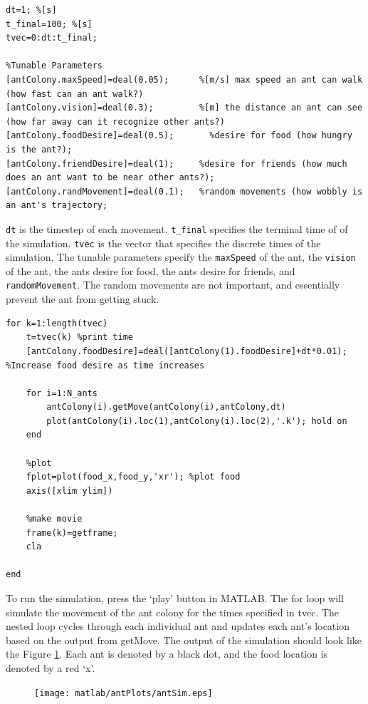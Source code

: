 \documentclass[12pt]{article}
\begin{document}
\begin{lstlisting}[frame=single]
%% Run movement simulation
dt=1; %[s]
t_final=100; %[s]
tvec=0:dt:t_final;

%Tunable Parameters
[antColony.maxSpeed]=deal(0.05);      %[m/s] max speed an ant can walk (how fast can an ant walk?)
[antColony.vision]=deal(0.3);         %[m] the distance an ant can see (how far away can it recognize other ants?)
[antColony.foodDesire]=deal(0.5);       %desire for food (how hungry is the ant?);
[antColony.friendDesire]=deal(1);     %desire for friends (how much does an ant want to be near other ants?);
[antColony.randMovement]=deal(0.1);   %random movements (how wobbly is an ant's trajectory;
\end{lstlisting}

\lstinline|dt| is the timestep of each movement. \lstinline|t_final| specifies the terminal time of of the simulation. \lstinline|tvec| is the vector that specifies the discrete times of the simulation. 
The tunable parameters specify the \lstinline|maxSpeed| of the ant, the \lstinline|vision| of the ant, the ants desire for food, the ants desire for friends, and \lstinline|randomMovement|. The random movements are not important, and essentially prevent the ant from getting stuck.
  

\begin{lstlisting}[frame=single]
for k=1:length(tvec)
    t=tvec(k) %print time
    [antColony.foodDesire]=deal([antColony(1).foodDesire]+dt*0.01); %Increase food desire as time increases

    for i=1:N_ants        
        antColony(i).getMove(antColony(i),antColony,dt)
        plot(antColony(i).loc(1),antColony(i).loc(2),'.k'); hold on
    end
    
    %plot
    fplot=plot(food_x,food_y,'xr'); %plot food
    axis([xlim ylim])
    
    %make movie
    frame(k)=getframe;
    cla
    
end
\end{lstlisting}

To run the simulation, press the `play' button in MATLAB. The for loop will simulate the movement of the ant colony for the times specified in tvec. The nested loop cycles through each individual ant and updates each ant's location based on the output from getMove. The output of the simulation should look like the Figure \ref{fig_movement_sim}. Each ant is denoted by a black dot, and the food location is denoted by a red `x'.

\begin{figure}[H]
\centering
\texttt{[image: matlab/antPlots/antSim.eps]}
\label{fig_movement_sim}
\end{figure}
\end{document}
